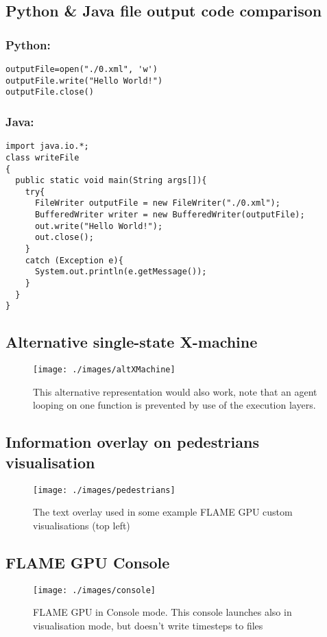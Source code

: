 \documentclass[11pt,a4paper]{article}
\begin{document}
\subsection{Python \& Java file output code comparison}
\label{pyFileJavaFile}
\subsubsection{Python:}
\begin{lstlisting}
outputFile=open("./0.xml", 'w')
outputFile.write("Hello World!")
outputFile.close()
\end{lstlisting}
\subsubsection{Java:}
\begin{lstlisting}
import java.io.*;
class writeFile 
{
  public static void main(String args[]){
    try{
      FileWriter outputFile = new FileWriter("./0.xml");
      BufferedWriter writer = new BufferedWriter(outputFile);
      out.write("Hello World!");
      out.close();
    }
    catch (Exception e){
      System.out.println(e.getMessage());
    }
  }
}

\end{lstlisting}

\subsection{Alternative single-state X-machine}
\label{altXmachine}
\begin{figure}[h!]
\texttt{[image: ./images/altXMachine]}
\caption[Alternative Single state X-machine]{This alternative representation would also work, note that an agent looping on one function is prevented by use of the execution layers.}
\end{figure}

\subsection{Information overlay on pedestrians visualisation}
\label{pedestrians}
\begin{figure}[H]
\texttt{[image: ./images/pedestrians]}
\caption[Information overlay on pedestrians visualisation]{The text overlay used in some example FLAME GPU custom visualisations (top left)}
\end{figure}

\subsection{FLAME GPU Console}
\label{consoleAppendix}
\begin{figure}[H]
\texttt{[image: ./images/console]}
\caption[FLAME GPU Console]{FLAME GPU in Console mode. This console launches also in visualisation mode, but doesn't write timesteps to files}
\end{figure}
\end{document}
